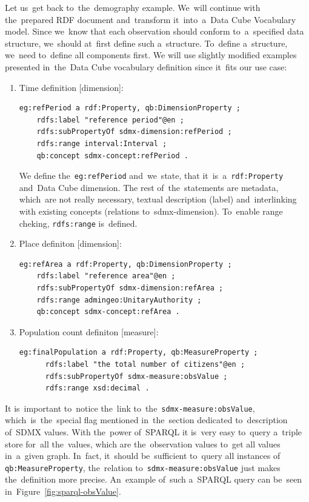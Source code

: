 Let us~get back to~the~demography example. We~will continue with the~prepared RDF
document and~transform it~into~a~Data Cube Vocabulary model. Since we~know that each
observation should conform to~a~specified data structure, we~should at~first define
such a~structure. To~define a~structure, we~need to~define all components first.
We will use slightly modified examples presented in~the~Data Cube vocabulary
definition since it~fits our use case:

\begin{enumerate}
\item Time definition [dimension]:

\begin{verbatim}
eg:refPeriod a rdf:Property, qb:DimensionProperty ;
    rdfs:label "reference period"@en ;
    rdfs:subPropertyOf sdmx-dimension:refPeriod ;
    rdfs:range interval:Interval ;
    qb:concept sdmx-concept:refPeriod .
\end{verbatim}

We define the~\texttt{eg:refPeriod} and~we~state, that it~is~a~\texttt{rdf:Property} and~Data Cube dimension.
The rest of~the~statements are metadata, which~are not really necessary, textual description
(label) and~interlinking with existing concepts (relations to~sdmx-dimension). To~enable range
cheking, \texttt{rdfs:range} is~defined.

\item Place definiton [dimension]:

\begin{verbatim}
eg:refArea a rdf:Property, qb:DimensionProperty ;
    rdfs:label "reference area"@en ;
    rdfs:subPropertyOf sdmx-dimension:refArea ;
    rdfs:range admingeo:UnitaryAuthority ;
    qb:concept sdmx-concept:refArea .
\end{verbatim}

\item Population count definiton [measure]:
\begin{verbatim}
eg:finalPopulation a rdf:Property, qb:MeasureProperty ;
      rdfs:label "the total number of citizens"@en ;
      rdfs:subPropertyOf sdmx-measure:obsValue ;
      rdfs:range xsd:decimal .
\end{verbatim}
\end{enumerate}

\begin{sloppypar}
It is~important to~notice the~link to~the~\texttt{sdmx-measure:obsValue}, which~is~the~special flag
mentioned in~the~section dedicated to~description of~SDMX values. With the~power of~SPARQL
it is~very easy to~query a~triple store for~all the~values, which are the~observation values to~get
all values in~a~given graph. In~fact, it~should be~sufficient to~query all instances of
\texttt{qb:MeasureProperty}, the~relation to~\texttt{sdmx-measure:obsValue} just makes the~definition
more precise. An~example of~such a~SPARQL query can be~seen in~Figure~\ref{fig:sparql-obsValue}.
\end{sloppypar}

